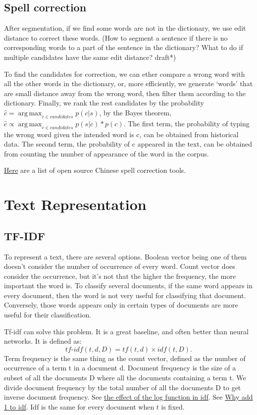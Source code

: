 \documentclass{report}
\DeclareMathOperator*{\argmax}{arg\,max}
\begin{document}
\section{Spell correction}
After segmentation, if we find some words are not in the dictionary, we use edit distance to correct these words. (How to segment a sentence if there is no corresponding words to a part of the sentence in the dictionary? What to do if multiple candidates have the same edit distance? draft*)

To find the candidates for correction, we can ether compare a wrong word with all the other words in the dictionary, or, more efficiently, we generate `words' that are small distance away from the wrong word, then filter them according to the dictionary. Finally, we rank the rest candidates by the probability $\hat{c} = \argmax_{c \in candidates} p(c|s)$, by the Bayes theorem, $\hat{c} \propto \argmax_{c \in candidates} p(s|c) * p(c)$. The first term, the probability of typing the wrong word given the intended word is c, can be obtained from historical data. The second term, the probability of c appeared in the text, can be obtained from counting the number of appearance of the word in the corpus.

\href{https://github.com/li-aolong/li-aolong.github.io/issues/12}{Here} are a list of open source Chinese spell correction tools.

\chapter{Text Representation}
\section{TF-IDF}
To represent a text, there are several options. Boolean vector being one of them doesn't consider the number of occurrence of every word. Count vector does consider the occurrence, but it's not that the higher the frequency, the more important the word is. To classify several documents, if the same word appears in every document, then the word is not very useful for classifying that document. Conversely, those words appears only in certain types of documents are more useful for their classification.

Tf-idf can solve this problem. It is a great baseline, and often better than neural networks. It is defined as: \[
	tf\text{-}idf(t, d, D) = tf(t, d) \times idf(t, D)
.\] 
Term frequency is the same thing as the count vector, defined as the number of occurrence of a term t in a document d. Document frequency is the size of a subset of all the documents D where all the documents containing a term t. We divide document frequency by the total number of all the documents D to get inverse document frequency. 
See \href{https://stackoverflow.com/q/27067992/9851286}{the effect of the log function in idf}. See \href{https://stats.stackexchange.com/q/166812/354019}{Why add 1 to idf}.
Idf is the same for every document when $t$ is fixed.
\end{document}
